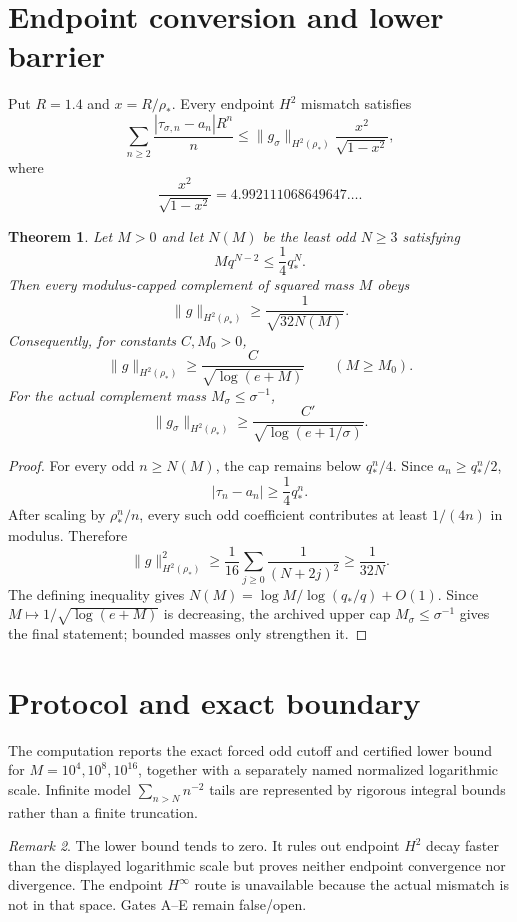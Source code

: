 \documentclass[11pt]{article}
\newtheorem{theorem}{Theorem}[section]
\theoremstyle{remark}\newtheorem{remark}[theorem]{Remark}
\begin{document}
\section{Endpoint conversion and lower barrier}
Put $R=1.4$ and $x=R/\rho_*$.  Every endpoint $H^2$ mismatch satisfies
\[
 \sum_{n\ge2}\frac{|\tau_{\sigma,n}-a_n|R^n}{n}
 \le\|g_\sigma\|_{H^2(\rho_*)}
 \frac{x^2}{\sqrt{1-x^2}},
\]
where
\[
 \frac{x^2}{\sqrt{1-x^2}}
 =4.992111068649647\ldots.
\]

\begin{theorem}\label{thm:barrier}
Let $M>0$ and let $N(M)$ be the least odd $N\ge3$ satisfying
\[
 Mq^{N-2}\le\frac14q_*^N.
\]
Then every modulus-capped complement of squared mass $M$ obeys
\[
 \boxed{
 \|g\|_{H^2(\rho_*)}
 \ge\frac1{\sqrt{32N(M)}}.}
\]
Consequently, for constants $C,M_0>0$,
\[
 \|g\|_{H^2(\rho_*)}
 \ge\frac{C}{\sqrt{\log(e+M)}}
 \qquad(M\ge M_0).
\]
For the actual complement mass $M_\sigma\le\sigma^{-1}$,
\[
 \|g_\sigma\|_{H^2(\rho_*)}
 \ge\frac{C'}{\sqrt{\log(e+1/\sigma)}}.
\]
\end{theorem}
\begin{proof}
For every odd $n\ge N(M)$, the cap remains below $q_*^n/4$.  Since
$a_n\ge q_*^n/2$,
\[
 |\tau_n-a_n|\ge\frac14q_*^n.
\]
After scaling by $\rho_*^n/n$, every such odd coefficient contributes at
least $1/(4n)$ in modulus.  Therefore
\[
 \|g\|_{H^2(\rho_*)}^2
 \ge\frac1{16}
 \sum_{j\ge0}\frac1{(N+2j)^2}
 \ge\frac1{32N}.
\]
The defining inequality gives
$N(M)=\log M/\log(q_*/q)+O(1)$.  Since
$M\mapsto1/\sqrt{\log(e+M)}$ is decreasing, the archived upper cap
$M_\sigma\le\sigma^{-1}$ gives the final statement; bounded masses only
strengthen it.
\end{proof}

\section{Protocol and exact boundary}
The computation reports the exact forced odd cutoff and certified lower
bound for $M=10^4,10^8,10^{16}$, together with a separately named normalized
logarithmic scale.  Infinite model $\sum_{n>N}n^{-2}$ tails are represented
by rigorous integral bounds rather than a finite truncation.

\begin{remark}
The lower bound tends to zero.  It rules out endpoint $H^2$ decay faster
than the displayed logarithmic scale but proves neither endpoint convergence
nor divergence.
The endpoint $H^\infty$ route is unavailable because the actual mismatch is
not in that space.  Gates A--E remain false/open.
\end{remark}
\end{document}

